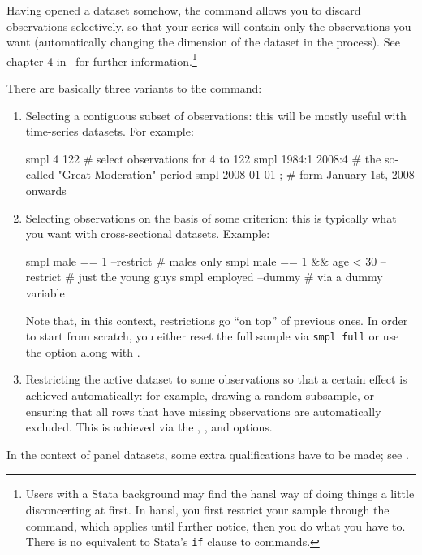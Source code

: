 Having opened a dataset somehow, the  command allows you to
discard observations selectively, so that your series will contain
only the observations you want (automatically changing the dimension
of the dataset in the process). See chapter 4 in \GUG\ for further
information.\footnote{Users with a Stata background may find the hansl
  way of doing things a little disconcerting at first. In hansl, you
  first restrict your sample through the  command, which
  applies until further notice, then you do what you have to. There is
  no equivalent to Stata's \texttt{if} clause to commands.}

There are basically three variants to the  command:
\begin{enumerate}
\item Selecting a contiguous subset of observations: this will be
  mostly useful with time-series datasets. For example:
  \begin{code}
    smpl 4 122            # select observations for 4 to 122
    smpl 1984:1 2008:4    # the so-called "Great Moderation" period
    smpl 2008-01-01 ;     # form January 1st, 2008 onwards
  \end{code}
\item Selecting observations on the basis of some criterion: this is
  typically what you want with cross-sectional datasets. Example:
  \begin{code}
    smpl male == 1 --restrict                # males only
    smpl male == 1 && age < 30 --restrict    # just the young guys
    smpl employed --dummy                    # via a dummy variable
  \end{code}
  Note that, in this context, restrictions go ``on top'' of previous
  ones. In order to start from scratch, you either reset the full
  sample via \texttt{smpl full} or use the  option
  along with .
\item Restricting the active dataset to some observations so that a
  certain effect is achieved automatically: for example, drawing a
  random subsample, or ensuring that all rows that have missing
  observations are automatically excluded. This is achieved via the
  , , and 
  options.
\end{enumerate}

In the context of panel datasets, some extra qualifications have to be
made; see \GUG.

